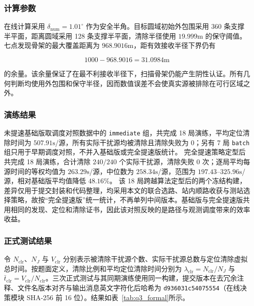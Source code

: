 \subsubsection{计算参数}

在线计算采用 $\delta_{\mathrm{num}}=1.01^\circ$ 作为安全半角。目标圆域初始外包围采用 360 条支撑半平面，距离圆域采用 128 条支撑半平面，清除半径使用 $19.999\mathrm{m}$ 的保守阈值。七点发现骨架的最大覆盖距离为 $968.9016\mathrm{m}$，距有效接收半径下界仍有

\begin{equation}
1000-968.9016=31.0984\mathrm{m}
\label{eq:q3_cover_margin}
\end{equation}

的余量。该余量保证了在最不利接收半径下，扫描骨架仍能产生阴性认证。所有几何判断均使用外包围和保守半径，因而数值误差不会使真实源被排除在可行区域之外。

\subsubsection{演练结果}

未提速基础版取调度对照数据中的 \texttt{immediate} 组，共完成 18 局演练，平均定位清除时间为 $507.91\mathrm{s}$/源，所有实际干扰源均被清除且清除失败为 0；另有 7 局 \texttt{batch} 组只用于早期调度对照，不并入基础版或完全提速版统计。
完全提速策略定型后共完成 18 局演练，合计清除 $240/240$ 个实际干扰源，清除失败 0 次；逐局平均每源时间的等权均值为 $263.29\mathrm{s}$/源，中位数为 $258.34\mathrm{s}$/源，范围为 $197.43$--$325.96\mathrm{s}$/源，相对基础版平均值降低 $48.16\%$。
该 18 局跨越算法定型后的两个冻结构建，差异仅用于提交封装和代码整理，均采用本文的联合选路、站内顺路收获与测站选择策略，故按“完全提速版”统一统计，不再单列中间版本。基础版与完全提速版共用相同的发现、定位和清除证书，因此该对照反映的是路径与观测调度带来的效率收益。

\subsubsection{正式测试结果}

令 $N_{\mathrm{clr}}$、$N_J$ 与 $V_{\mathrm{clr}}$ 分别表示被清除干扰源个数、实际干扰源总数与定位清除虚拟总时间。按题面定义，清除比例和平均定位清除时间分别为 $\lambda_{\mathrm{clr}}=N_{\mathrm{clr}}/N_J$ 与 $\bar t_{\mathrm{clr}}=V_{\mathrm{clr}}/N_{\mathrm{clr}}$。三次正式测试与其同期演练使用同一构建，提交版本在去冗余注释、文件名版本对齐与输出消息英文字符化后哈希为 \texttt{d936031c54075554}（在线决策模块 SHA-256 前 16 位）。结果如表~\ref{tab:q3_formal}所示。

